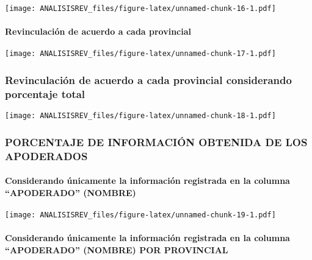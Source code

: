 \documentclass[
]{article}
\begin{document}
\texttt{[image: ANALISISREV\_files/figure-latex/unnamed-chunk-16-1.pdf]}

\hypertarget{revinculaciuxf3n-de-acuerdo-a-cada-provincial}{%
\paragraph{Revinculación de acuerdo a cada
provincial}\label{revinculaciuxf3n-de-acuerdo-a-cada-provincial}}

\texttt{[image: ANALISISREV\_files/figure-latex/unnamed-chunk-17-1.pdf]}

\hypertarget{revinculaciuxf3n-de-acuerdo-a-cada-provincial-considerando-porcentaje-total}{%
\subsubsection{Revinculación de acuerdo a cada provincial considerando
porcentaje
total}\label{revinculaciuxf3n-de-acuerdo-a-cada-provincial-considerando-porcentaje-total}}

\texttt{[image: ANALISISREV\_files/figure-latex/unnamed-chunk-18-1.pdf]}

\hypertarget{porcentaje-de-informaciuxf3n-obtenida-de-los-apoderados}{%
\subsubsection{PORCENTAJE DE INFORMACIÓN OBTENIDA DE LOS
APODERADOS}\label{porcentaje-de-informaciuxf3n-obtenida-de-los-apoderados}}

\hypertarget{considerando-uxfanicamente-la-informaciuxf3n-registrada-en-la-columna-apoderado-nombre}{%
\paragraph{Considerando únicamente la información registrada en la
columna ``APODERADO''
(NOMBRE)}\label{considerando-uxfanicamente-la-informaciuxf3n-registrada-en-la-columna-apoderado-nombre}}

\texttt{[image: ANALISISREV\_files/figure-latex/unnamed-chunk-19-1.pdf]}

\hypertarget{considerando-uxfanicamente-la-informaciuxf3n-registrada-en-la-columna-apoderado-nombre-por-provincial}{%
\paragraph{Considerando únicamente la información registrada en la
columna ``APODERADO'' (NOMBRE) POR
PROVINCIAL}\label{considerando-uxfanicamente-la-informaciuxf3n-registrada-en-la-columna-apoderado-nombre-por-provincial}}
\end{document}
